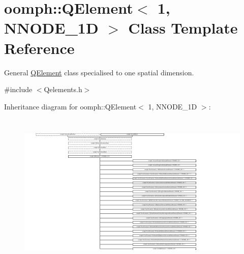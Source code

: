 \hypertarget{classoomph_1_1QElement_3_011_00_01NNODE__1D_01_4}{}\section{oomph\+:\+:Q\+Element$<$ 1, N\+N\+O\+D\+E\+\_\+1D $>$ Class Template Reference}
\label{classoomph_1_1QElement_3_011_00_01NNODE__1D_01_4}


General \hyperlink{classoomph_1_1QElement}{Q\+Element} class specialised to one spatial dimension.  




{\ttfamily \#include $<$Qelements.\+h$>$}

Inheritance diagram for oomph\+:\+:Q\+Element$<$ 1, N\+N\+O\+D\+E\+\_\+1D $>$\+:\begin{figure}[H]
\begin{center}
\leavevmode
\includegraphics[height=7.578948cm]{classoomph_1_1QElement_3_011_00_01NNODE__1D_01_4}
\end{center}
\end{figure}
